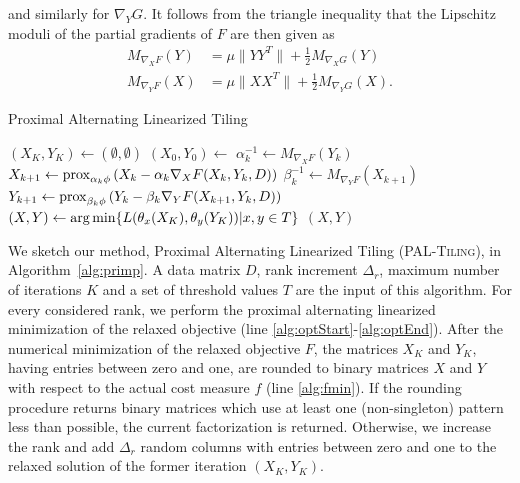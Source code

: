 and similarly for $\nabla_YG$. It follows from the triangle inequality that the Lipschitz moduli of the partial gradients of $F$ are then given as
\begin{align*}
M_{\nabla_XF}(Y) &= \mu\|YY^T\| + \frac{1}{2}M_{\nabla_XG}(Y)\\ 
M_{\nabla_YF}(X) &= \mu\|XX^T\| + \frac{1}{2}M_{\nabla_YG}(X).
\end{align*}
\begin{algorithm}[t]
\caption{Proximal Alternating Linearized Tiling} 
\begin{algorithmic}[1]
  	\State $(X_K,Y_K)\gets (\emptyset,\emptyset)$
    	\State $(X_0,Y_0)\gets$ 
    \label{alg:optStart}  
    	\State $\alpha_k^{-1} \gets M_{\nabla_XF}(Y_k)$ 
        \State $X_{k+1} \gets \operatorname{prox}_{\alpha_k\phi}\left(X_k-\alpha_k\nabla_XF(X_k,Y_k,D)\right)$ 
       	\State $\beta_k^{-1} \gets M_{\nabla_YF}(X_{k+1})$ 
        \State $Y_{k+1} \gets \operatorname{prox}_{\beta_k\phi}\left(Y_k-\beta_k\nabla_YF(X_{k+1},Y_k,D)\right)$ 
    \EndFor\label{alg:optEnd}
    \State $(X,Y)\gets \operatorname*{arg\,min}\{L(\theta_x(X_K),\theta_y(Y_K))|x,y\in T\}$\label{alg:fmin}
    	\State \Return $(X,Y)$
    \EndIf
    \EndFor
  \EndFunction
\end{algorithmic}
\label{alg:primp}
\end{algorithm}

We sketch our method, Proximal Alternating Linearized Tiling (\textsc{PAL-Tiling}), in Algorithm~\ref{alg:primp}. 
A data matrix $D$, rank increment $\Delta_r$, maximum number of iterations $K$ and a set of threshold values $T$ are the input of this algorithm. 
For every considered rank, we perform the proximal alternating linearized minimization of the relaxed objective (line \ref{alg:optStart}-\ref{alg:optEnd}). After the numerical minimization of the relaxed objective $F$, the matrices $X_K$ and $Y_K$, having entries between zero and one, are rounded to binary matrices $X$ and $Y$ with respect to the actual cost measure $f$ (line \ref{alg:fmin}). If the rounding procedure returns binary matrices which use at least one (non-singleton) pattern less than possible, the current factorization is returned. Otherwise, we increase the rank and add $\Delta_r$ random columns with entries between zero and one to the relaxed solution of the former iteration $(X_K,Y_K)$.

